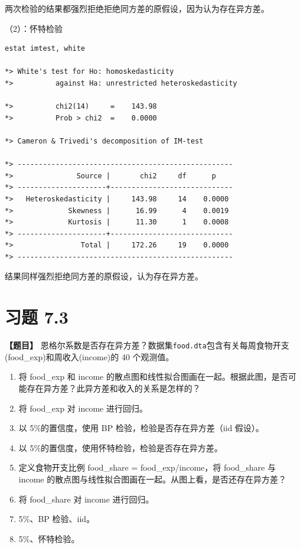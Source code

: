 \documentclass[cn,fancy,blue,11pt]{elegantbook}
\begin{document}
两次检验的结果都强烈拒绝拒绝同方差的原假设，因为认为存在异方差。

（2）：怀特检验

\begin{lstlisting}
estat imtest, white

*> White's test for Ho: homoskedasticity
*>          against Ha: unrestricted heteroskedasticity

*>          chi2(14)     =    143.98
*>          Prob > chi2  =    0.0000

*> Cameron & Trivedi's decomposition of IM-test

*> ---------------------------------------------------
*>               Source |       chi2     df      p
*> ---------------------+-----------------------------
*>   Heteroskedasticity |     143.98     14    0.0000
*>             Skewness |      16.99      4    0.0019
*>             Kurtosis |      11.30      1    0.0008
*> ---------------------+-----------------------------
*>                Total |     172.26     19    0.0000
*> ---------------------------------------------------
\end{lstlisting}

结果同样强烈拒绝同方差的原假设，认为存在异方差。

\hypertarget{section-47}{%
\section{习题 7.3}\label{section-47}}

\textbf{【题目】}
恩格尔系数是否存在异方差？数据集\lstinline{food.dta}包含有关每周食物开支(food\_exp)和周收入(income)的 40 个观测值。

\begin{enumerate}
  \item 将 food\_exp 和 income 的散点图和线性拟合图画在一起。根据此图，是否可能存在异方差？此异方差和收入的关系是怎样的？
  \item 将 food\_exp 对 income 进行回归。
  \item 以 5\%的置信度，使用 BP 检验，检验是否存在异方差（iid 假设）。
  \item 以 5\%的置信度，使用怀特检验，检验是否存在异方差。
  \item 定义食物开支比例 food\_share = food\_exp/income，将 food\_share 与 income 的散点图与线性拟合图画在一起。从图上看，是否还存在异方差？
  \item 将 food\_share 对 income 进行回归。
  \item 5\%、BP 检验、iid。
  \item 5\%、怀特检验。
\end{enumerate}
\end{document}
